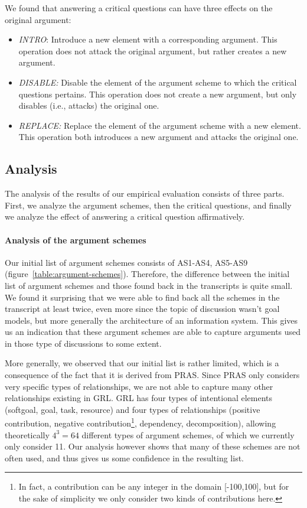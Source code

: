 We found that answering a critical questions can have three effects on the original argument:
\begin{itemize}
\item \emph{INTRO}: Introduce a new element with a corresponding argument. This operation does not attack the original argument, but rather creates a new argument.
\item \emph{DISABLE:} Disable the element of the argument scheme to which the critical questions pertains. This operation does not create a new argument, but only disables (i.e., attacks) the original one.
\item \emph{REPLACE:} Replace the element of the argument scheme with a new element. This operation both introduces a new argument and attacks the original one.
\end{itemize}

\subsection{Analysis}

The analysis of the results of our empirical evaluation consists of three parts. First, we analyze the argument schemes, then the critical questions, and finally we analyze the effect of answering a critical question affirmatively.

\paragraph{Analysis of the argument schemes}
Our initial list of argument schemes consists of AS1-AS4, AS5-AS9 (figure~\ref{table:argument-schemes}). Therefore, the difference between the initial list of argument schemes and those found back in the transcripts is quite small. We found it surprising that we were able to find back all the schemes in the transcript at least twice, even more since the topic of discussion wasn't goal models, but more generally the architecture of an information system. This gives us an indication that these argument schemes are able to capture arguments used in those type of discussions to some extent. 

More generally, we observed that our initial list is rather limited, which is a consequence of the fact that it is derived from PRAS. Since PRAS only considers very specific types of relationships, we are not able to capture many other relationships existing in GRL. GRL has four types of intentional elements (softgoal, goal, task, resource) and four types of relationships (positive contribution, negative contribution\footnote{In fact, a contribution can be any integer in the domain [-100,100], but for the sake of simplicity we only consider two kinds of contributions here.}, dependency, decomposition), allowing theoretically $4^3=64$ different types of argument schemes, of which we currently only consider 11. Our analysis however shows that many of these schemes are not often used, and thus gives us some confidence in the resulting list.

